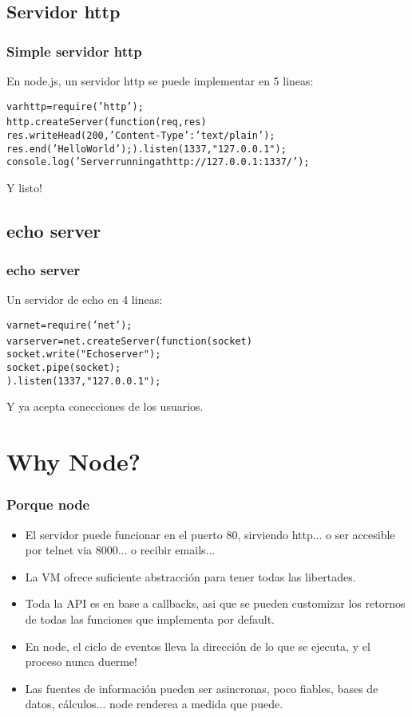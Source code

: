 \documentclass{beamer}
\begin{document}
\subsection{Servidor http}
\begin{frame}
\frametitle{Simple servidor http}
En node.js, un servidor http se puede implementar en 5 lineas:
\begin{alltt}
var http = require('http');\\
http.createServer(function (req, res) {\\
  res.writeHead(200, {'Content-Type': 'text/plain'});\\
  res.end('Hello World');}).listen(1337, "127.0.0.1");\\
console.log('Server running at http://127.0.0.1:1337/');\\
\end{alltt}
Y listo!
\end{frame}
\subsection{echo server}
\begin{frame}
\frametitle{echo server}
Un servidor de echo en 4 lineas:
\begin{alltt}
var net = require('net');\\
var server = net.createServer(function (socket) {\\
  socket.write("Echo server");\\
  socket.pipe(socket);
}).listen(1337, "127.0.0.1");\\
\end{alltt}
Y ya acepta conecciones de los usuarios.
\end{frame}
\section{Why Node?}
\begin{frame}
\frametitle{Porque node}
\begin{itemize}
\item El servidor puede funcionar en el puerto 80, sirviendo http... o ser accesible por telnet via 8000... o recibir emails...\\
\item La VM ofrece suficiente abstracci\'on para tener todas las libertades.
\item Toda la API es en base a callbacks, asi que se pueden customizar los retornos de todas las funciones que implementa por default.\\
\item En node, el ciclo de eventos lleva la direcci\'on de lo que se ejecuta, y el proceso nunca duerme!\\
\item Las fuentes de informaci\'on pueden ser asincronas, poco fiables, bases de datos, c\'alculos... node renderea a medida que puede.\\
\end{itemize}
\end{frame}
\end{document}
